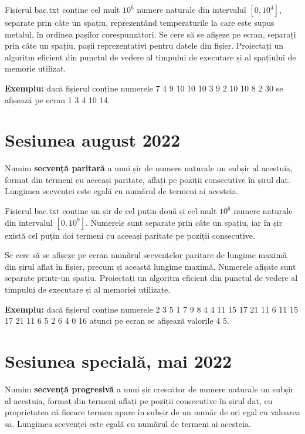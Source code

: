 \documentclass[10pt, a4paper]{article}
\newcommand{\highlight}[1]{{\ttfamily\color{red}#1}}
\begin{document}
\vspace{0.2cm}
Fișierul \highlight{bac.txt} conține cel mult \highlight{$10^6$} numere naturale din intervalul \highlight{$[0,10^4]$}, separate prin câte un spațiu, reprezentând temperaturile la care este supus metalul, în ordinea pașilor corespunzători. Se cere să se afișeze pe ecran, separați prin câte un spațiu, pașii reprezentativi pentru datele din fișier. Proiectați un algoritm eficient din punctul de vedere al timpului de executare și al spațiului de memorie utilizat.

\vspace{0.2cm}
\textbf{Exemplu:} dacă fișierul conține numerele \highlight{7 4 9 10 10 10 3 9 2 10 10 8 2 30} se afișează pe ecran \highlight{1 3 4 10 14}.


\section{Sesiunea august 2022}
Numim \textbf{secvență paritară} a unui șir de numere naturale un subșir al acestuia, format din termeni cu aceeași paritate, aflați pe poziții consecutive în șirul dat. Lungimea secvenței este egală cu numărul de termeni ai acesteia.

\vspace{0.2cm}
\noindent Fișierul \highlight{bac.txt} conține un șir de cel puțin două și cel mult \highlight{$10^6$} numere naturale din intervalul \highlight{$[0,10^9]$}. Numerele sunt separate prin câte un spațiu, iar în șir există cel puțin doi termeni cu aceeași paritate pe poziții consecutive.

\vspace{0.2cm}
\noindent Se cere să se afișeze pe ecran numărul secvențelor paritare de lungime maximă din șirul aflat în fișier, precum și această lungime maximă. Numerele afișate sunt separate printr-un spațiu. Proiectați un algoritm eficient din punctul de vedere al timpului de executare și al memoriei utilizate.

\vspace{0.2cm}
\noindent \textbf{Exemplu:} dacă fișierul conține numerele \highlight{2 3 5 1 7 9 8 4 4 11 15 17 21 11 6 11 15 17 21 11 6 5 2 6 4 0 16} atunci pe ecran se afișează valorile \highlight{4 5}.


\section{Sesiunea specială, mai 2022}
Numim \textbf{secvență progresivă} a unui șir crescător de numere naturale un subșir al acestuia, format din termeni aflați pe poziții consecutive în șirul dat, cu proprietatea că fiecare termen apare în subșir de un număr de ori egal cu valoarea sa. Lungimea secvenței este egală cu numărul de termeni ai acesteia.
\end{document}
